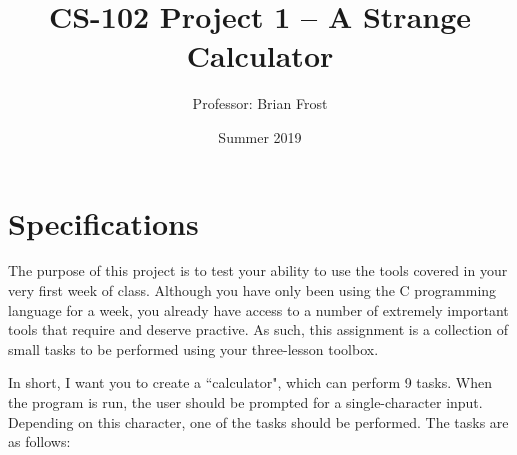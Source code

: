 \documentclass{article}
\title{CS-102 Project 1 -- A Strange Calculator}
\author{Professor: Brian Frost}
\date{Summer 2019}
\begin{document}
\maketitle

\section*{Specifications}
The purpose of this project is to test your ability to use the tools covered in your very first week of class. Although you have only been using the C programming language for a week, you already have access to a number of extremely important tools that require and deserve practive. As such, this assignment is a collection of small tasks to be performed using your three-lesson toolbox.

In short, I want you to create a ``calculator", which can perform 9 tasks. When the program is run, the user should be prompted for a single-character input. Depending on this character, one of the tasks should be performed. The tasks are as follows:
\end{document}
